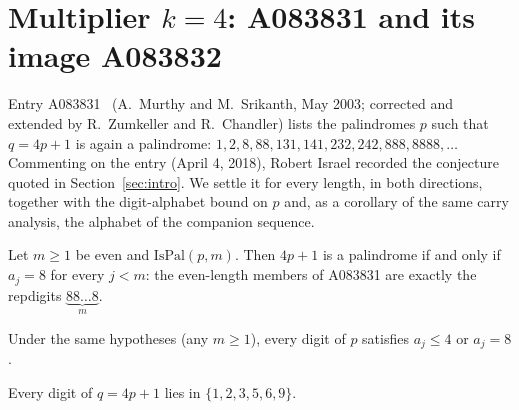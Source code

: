 \providecommand{\IsPal}{\mathrm{IsPal}}
\makeatletter
{}
\makeatother

\section{Multiplier $k = 4$: A083831 and its image A083832}
\label{sec:k4}

Entry A083831~\cite{oeis} (A.~Murthy and M.~Srikanth,
May 2003; corrected and extended by R.~Zumkeller and
R.~Chandler) lists the palindromes $p$ such that
$q = 4p+1$ is again a palindrome:
$1, 2, 8, 88, 131, 141, 232, 242, 888, 8888, \ldots$
Commenting on the entry (April 4, 2018), Robert Israel
recorded the conjecture quoted in
Section~\ref{sec:intro}. We settle it for every length,
in both directions, together with the digit-alphabet
bound on $p$ and, as a corollary of the same carry
analysis, the alphabet of the companion sequence.

\begin{theorem}
\label{thm:k4-even}
Let $m \ge 1$ be even and $\IsPal(p,m)$. Then $4p+1$ is
a palindrome if and only if $a_j = 8$ for every
$j < m$: the even-length members of A083831 are exactly
the repdigits $\underbrace{88\ldots8}_{m}$.
\end{theorem}

\begin{theorem}
\label{thm:k4-dig}
Under the same hypotheses (any $m \ge 1$), every digit
of $p$ satisfies $a_j \le 4$ or $a_j = 8$.
\end{theorem}

\begin{corollary}
\label{cor:k4-alphabet}
Every digit of $q = 4p+1$ lies in $\{1,2,3,5,6,9\}$.
\end{corollary}

